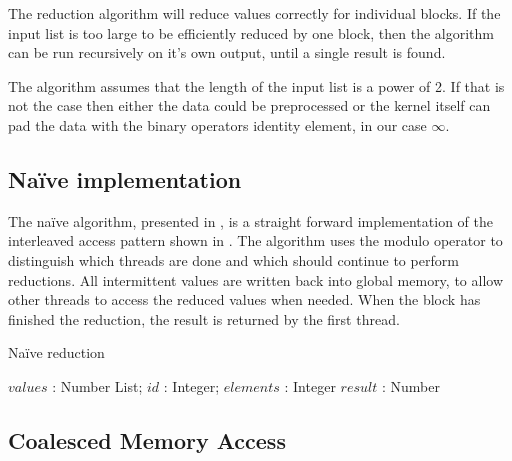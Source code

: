
The reduction algorithm will reduce values correctly for individual
blocks. If the input list is too large to be efficiently reduced by
one block, then the algorithm can be run recursively on it's own
output, until a single result is found.

The algorithm assumes that the length of the input list is a power of
2. If that is not the case then either the data could be preprocessed
or the kernel itself can pad the data with the binary operators
identity element, in our case $\infty$.

\subsection{Naïve implementation}

The naïve algorithm, presented in , is a
straight forward implementation of the interleaved access pattern
shown in . The algorithm uses the modulo operator
to distinguish which threads are done and which should continue to
perform reductions. All intermittent values are written back into
global memory, to allow other threads to access the reduced values
when needed. When the block has finished the reduction, the result
is returned by the first thread.

\begin{algorithm}
  \caption{Naïve reduction}
  \label{alg:naiveReduct}
  \begin{algorithmic}
              {$values$ : Number List; $id$ : Integer; $elements$ : Integer}
              {$result$ : Number}
              {
                  \ENDIF
                  \SYNC
                \ENDWHILE
                \ENDIF
              }
  \end{algorithmic}
\end{algorithm}

\subsection{Coalesced Memory Access}

